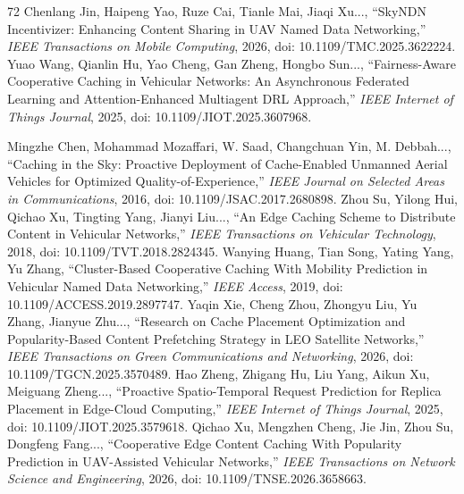 \documentclass[journal]{IEEEtran}
\begin{document}
\begin{thebibliography}{72}
Chenlang Jin, Haipeng Yao, Ruze Cai, Tianle Mai, Jiaqi Xu..., ``SkyNDN Incentivizer: Enhancing Content Sharing in UAV Named Data Networking,'' \textit{IEEE Transactions on Mobile Computing}, 2026, doi: 10.1109/TMC.2025.3622224.
Yuao Wang, Qianlin Hu, Yao Cheng, Gan Zheng, Hongbo Sun..., ``Fairness-Aware Cooperative Caching in Vehicular Networks: An Asynchronous Federated Learning and Attention-Enhanced Multiagent DRL Approach,'' \textit{IEEE Internet of Things Journal}, 2025, doi: 10.1109/JIOT.2025.3607968.

Mingzhe Chen, Mohammad Mozaffari, W. Saad, Changchuan Yin, M. Debbah..., ``Caching in the Sky: Proactive Deployment of Cache-Enabled Unmanned Aerial Vehicles for Optimized Quality-of-Experience,'' \textit{IEEE Journal on Selected Areas in Communications}, 2016, doi: 10.1109/JSAC.2017.2680898.
Zhou Su, Yilong Hui, Qichao Xu, Tingting Yang, Jianyi Liu..., ``An Edge Caching Scheme to Distribute Content in Vehicular Networks,'' \textit{IEEE Transactions on Vehicular Technology}, 2018, doi: 10.1109/TVT.2018.2824345.
Wanying Huang, Tian Song, Yating Yang, Yu Zhang, ``Cluster-Based Cooperative Caching With Mobility Prediction in Vehicular Named Data Networking,'' \textit{IEEE Access}, 2019, doi: 10.1109/ACCESS.2019.2897747.
Yaqin Xie, Cheng Zhou, Zhongyu Liu, Yu Zhang, Jianyue Zhu..., ``Research on Cache Placement Optimization and Popularity-Based Content Prefetching Strategy in LEO Satellite Networks,'' \textit{IEEE Transactions on Green Communications and Networking}, 2026, doi: 10.1109/TGCN.2025.3570489.
Hao Zheng, Zhigang Hu, Liu Yang, Aikun Xu, Meiguang Zheng..., ``Proactive Spatio-Temporal Request Prediction for Replica Placement in Edge-Cloud Computing,'' \textit{IEEE Internet of Things Journal}, 2025, doi: 10.1109/JIOT.2025.3579618.
Qichao Xu, Mengzhen Cheng, Jie Jin, Zhou Su, Dongfeng Fang..., ``Cooperative Edge Content Caching With Popularity Prediction in UAV-Assisted Vehicular Networks,'' \textit{IEEE Transactions on Network Science and Engineering}, 2026, doi: 10.1109/TNSE.2026.3658663.


\end{thebibliography}
\end{document}

